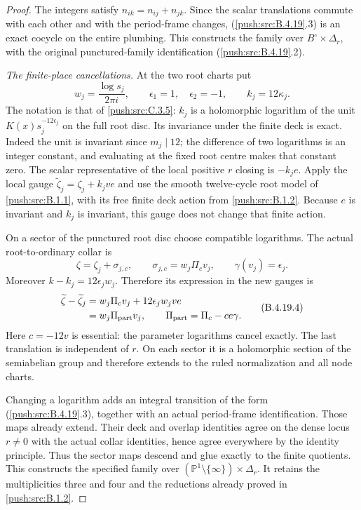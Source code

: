 \begin{proof}
The integers satisfy
$n_{ik}=n_{ij}+n_{jk}$. Since the scalar translations
commute with each other and with the period-frame
changes, (\ref{push:src:B.4.19}.3) is an exact cocycle on the entire
plumbing. This constructs the family over
$B^\circ\times\Delta_r$, with the original
punctured-family identification (\ref{push:src:B.4.19}.2).

\emph{The finite-place cancellations.}
At the two root charts put
\[
 w_j=\frac{\log s_j}{2\pi i},\qquad
 \epsilon_1=1,\quad\epsilon_2=-1,
 \qquad k_j=12\kappa_j.
\]
The notation is that of \ref{push:src:C.3.5}: $k_j$ is a
holomorphic logarithm of the unit
$K(x)s_j^{-12\epsilon_j}$ on the full root disc.
Its invariance under the finite deck is exact.
Indeed the unit is invariant since $m_j\mid12$;
the difference of two logarithms is an integer
constant, and evaluating at the fixed root centre
makes that constant zero. The scalar representative
of the local positive $r$ closing is $-k_j e$.
Apply the local gauge
$\widetilde\zeta_j=\zeta_j+k_jve$ and use the
smooth twelve-cycle root model of \ref{push:src:B.1.1}, with its
free finite deck action from \ref{push:src:B.1.2}. Because $e$ is
invariant and $k_j$ is invariant, this gauge does
not change that finite action.

On a sector of the punctured root disc choose
compatible logarithms. The actual root-to-ordinary
collar is
\[
 \zeta=\zeta_j+\sigma_{j,c},\qquad
 \sigma_{j,c}=w_j\Pi_c v_j,
 \qquad \gamma(v_j)=\epsilon_j.
\]
Moreover $k-k_j=12\epsilon_jw_j$. Therefore its
expression in the new gauges is
\[
 \begin{aligned}
 \widetilde\zeta-\widetilde\zeta_j
 &=w_j\Pi_c v_j+12\epsilon_jw_jve\\
 &=w_j\Pi_{\rm part}v_j,
 \qquad \Pi_{\rm part}=\Pi_c-ce\gamma.
 \end{aligned}
 \tag{B.4.19.4}
\]
Here $c=-12v$ is essential: the parameter logarithms
cancel exactly. The last translation is independent
of $r$. On each sector it is a holomorphic section
of the semiabelian group and therefore extends to
the ruled normalization and all node charts.

Changing a logarithm adds an integral transition
of the form (\ref{push:src:B.4.19}.3), together with an actual
period-frame identification. Those maps already
extend. Their deck and overlap identities agree
on the dense locus $r\ne0$ with the actual collar
identities, hence agree everywhere by the identity
principle. Thus the sector maps descend and glue
exactly to the finite quotients. This constructs
the specified family over
$(\mathbb P^1\setminus\{\infty\})\times\Delta_r$.
It retains the multiplicities three and four and
the reductions already proved in \ref{push:src:B.1.2}.


\end{proof}

